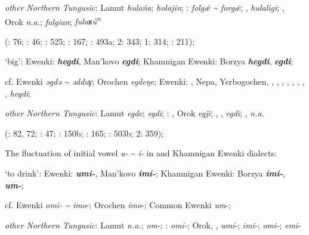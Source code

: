 \documentclass[output=paper,colorlinks,citecolor=brown]{langscibook}
\begin{document}
    \textit{other Northern Tungusic}: Lamut \textit{hulańa};  \textit{holajin}; \textit{}:  \textit{folg\={æ} {\textasciitilde} forg\={æ}}; ,  \textit{hulaligi}; , Orok \textit{n.a.};  \textit{fulgian};  \textit{fulaʁů\textsuperscript{n}} 
    
    (\citealt{Castrén1856}: 76; \citealt{Janhunen1991}: 46; \citealt{Dorji1998}: 525; \citealt{Chaoke2014a}: 167; \citealt{Vasilevic1958}: 493a; \citealt{Cincius1975B} 2: 343; \citealt{Hauer1952} 1: 314; \citealt{Zikmundová2013a}: 211);

    \ex ‘big’:  Ewenki:  \textbf{\textit{hegdi}}, Man’kovo \textbf{\textit{egdi}}; Khamnigan Ewenki: Borzya \textbf{\textit{hegdi}},  \textbf{\textit{egdi}};

    cf.  Ewenki \textit{ǝgdǝ {\textasciitilde} ǝdduγ}; Orochen \textit{egdeŋe};  Ewenki: , Nepa, Yerbogochen, , , , , , , , ,  \textit{hegdi};

    \textit{other Northern Tungusic}: Lamut \textit{egde};  \textit{egdi}; \textit{}: , Orok \textit{egǰi}; , ,  \textit{egdi}; ,  \textit{n.a.} 
    
    (\citealt{Castrén1856}: 82, 72; \citealt{Janhunen1991}: 47; \citealt{Dorji1998}: 150b; \citealt{Chaoke2014a}: 165; \citealt{Vasilevic1958}: 503b; \citealt{Cincius1975B} 2: 359);
\z
\z

\ea
The fluctuation of initial vowel \textit{u-} {\textasciitilde} \textit{i-} in  and Khamnigan Ewenki dialects:

\ea ‘to drink’:  Ewenki:  \textbf{\textit{umi-}}, Man’kovo \textbf{\textit{imi-}}; Khamnigan Ewenki: Borzya \textbf{\textit{imi-}},  \textbf{\textit{um-}};

    cf.  Ewenki \textit{omi- {\textasciitilde} imo}{}-; Orochen \textit{imo}{}-;  Common Ewenki \textit{um}{}-;

    \textit{other Northern Tungusic}: Lamut \textit{n.a.};  \textit{om-}; \textit{}:  \textit{omi-}; Orok, ,  \textit{umi}{}-;  \textit{imi-};  \textit{omi-};  \textit{emi-}
    
\end{document}
